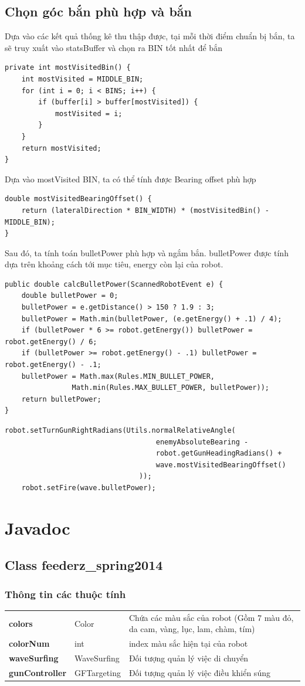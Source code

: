 \documentclass[14pt]{article}
\begin{document}
\subsection{Chọn góc bắn phù hợp và bắn}
Dựa vào các kết quả thống kê thu thập được, tại mỗi thời điểm chuẩn bị bắn, ta sẽ truy xuất vào statsBuffer và chọn ra BIN tốt nhất để bắn
\begin{lstlisting}[caption = mostVisitedBin, frame = single]
private int mostVisitedBin() {
	int mostVisited = MIDDLE_BIN;
	for (int i = 0; i < BINS; i++) {
		if (buffer[i] > buffer[mostVisited]) {
			mostVisited = i;
		}
	}
	return mostVisited;
}	
\end{lstlisting}
Dựa vào mostVisited BIN, ta có thể tính được Bearing offset phù hợp
\begin{lstlisting}[caption = mostVisitedBearingOffset, frame = single]
double mostVisitedBearingOffset() {
	return (lateralDirection * BIN_WIDTH) * (mostVisitedBin() - MIDDLE_BIN);
}
\end{lstlisting}
Sau đó, ta tính toán bulletPower phù hợp và ngắm bắn. bulletPower được tính dựa trên khoảng cách tới mục tiêu, energy còn lại của robot.
\begin{lstlisting}[caption = tính bulletPower, frame = single]
public double calcBulletPower(ScannedRobotEvent e) {
	double bulletPower = 0;
	bulletPower = e.getDistance() > 150 ? 1.9 : 3;
	bulletPower = Math.min(bulletPower, (e.getEnergy() + .1) / 4);
	if (bulletPower * 6 >= robot.getEnergy()) bulletPower = robot.getEnergy() / 6;
	if (bulletPower >= robot.getEnergy() - .1) bulletPower = robot.getEnergy() - .1;
	bulletPower = Math.max(Rules.MIN_BULLET_POWER, 
				Math.min(Rules.MAX_BULLET_POWER, bulletPower));
	return bulletPower;
}
\end{lstlisting}
\begin{lstlisting}[caption = ngắm bắn, frame = single]
	robot.setTurnGunRightRadians(Utils.normalRelativeAngle(
									enemyAbsoluteBearing -
									robot.getGunHeadingRadians() +
									wave.mostVisitedBearingOffset()
								));
	robot.setFire(wave.bulletPower);
\end{lstlisting}
\section{Javadoc}
\subsection{Class feederz\_spring2014}
\subsubsection{Thông tin các thuộc tính}
\begin{tabular}{llp{12cm}}
\textbf{colors}&Color&Chứa các màu sắc của robot (Gồm 7 màu đỏ, da cam, vàng, lục, lam, chàm, tím)\\
\textbf{colorNum}&int&index màu sắc hiện tại của robot\\
\textbf{waveSurfing}&WaveSurfing&Đối tượng quản lý việc di chuyển\\
\textbf{gunController}&GFTargeting&Đối tượng quản lý việc điều khiển súng\\
\end{tabular}
\end{document}
